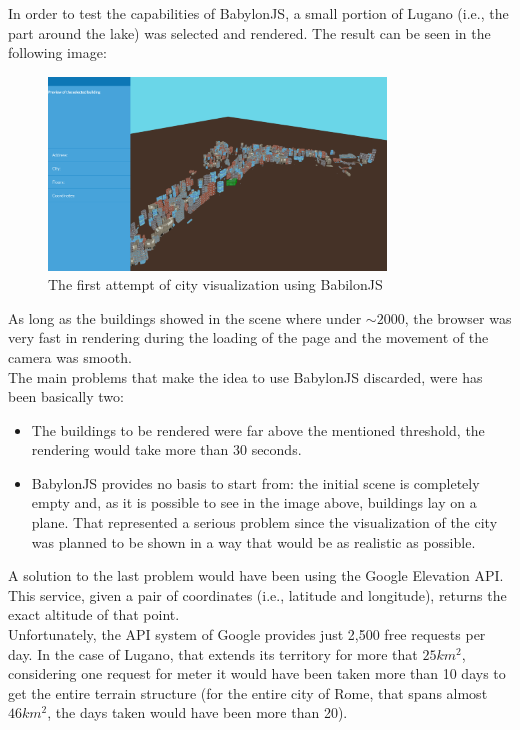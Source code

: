 In order to test the capabilities of BabylonJS, a small portion of Lugano (i.e., the part around the lake) was selected and rendered. The result can be seen in the following image:
\begin{figure}[H]
\centering
\includegraphics[width=0.8\textwidth]{chapter3/images/babylonJS}
\caption{The first attempt of city visualization using BabilonJS}
\label{fig:babilonJS}
\end{figure}
As long as the buildings showed in the scene where under $\sim 2000$, the browser was very fast in rendering during the loading of the page and the movement of the camera was smooth.\\
The main problems that make the idea to use BabylonJS discarded, were has been basically two:
\begin{itemize}
	\item The buildings to be rendered were far above the mentioned threshold, the rendering would take more than 30 seconds.
	\item BabylonJS provides no basis to start from: the initial scene is completely empty and, as it is possible to see in the image above, buildings lay on a plane. That represented a serious problem since the visualization of the city was planned to be shown in a way that would be as realistic as possible.
\end{itemize}
A solution to the last problem would have been using the Google Elevation API. This service, given a pair of coordinates (i.e., latitude and longitude), returns the exact altitude of that point.\\

Unfortunately, the API system of Google provides just 2,500 free requests per day. In the case of Lugano, that extends its territory for more that $25km^2$, considering one request for meter it would have been taken more than 10 days to get the entire terrain structure (for the entire city of Rome, that spans almost $46km^2$, the days taken would have been more than 20).\\

